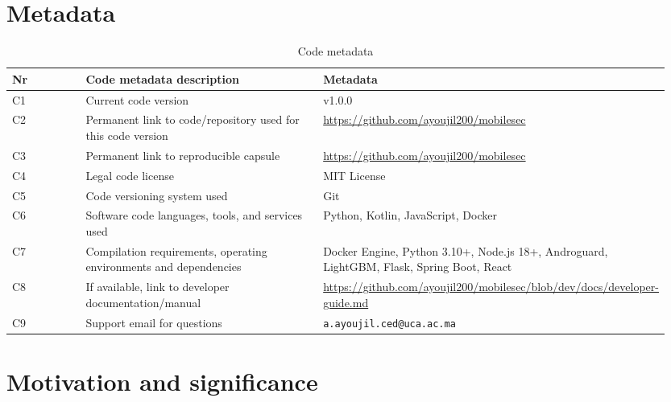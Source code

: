 \documentclass[preprint,12pt, a4paper]{elsarticle}
\begin{document}

\section*{Metadata}
\begin{table}[H]
\caption{Code metadata}
\label{codeMetadata}
\centering
\footnotesize
\renewcommand{\arraystretch}{1.15}
\begin{tabular}{p{0.12\linewidth} p{0.38\linewidth} p{0.45\linewidth}}
\hline
\textbf{Nr} & \textbf{Code metadata description} & \textbf{Metadata} \\
\hline

C1 & Current code version 
& v1.0.0 \\

C2 & Permanent link to code/repository used for this code version 
& \url{https://github.com/ayoujil200/mobilesec} \\

C3 & Permanent link to reproducible capsule 
& \url{https://github.com/ayoujil200/mobilesec} \\

C4 & Legal code license 
& MIT License \\

C5 & Code versioning system used 
& Git \\

C6 & Software code languages, tools, and services used 
& Python, Kotlin, JavaScript, Docker \\

C7 & Compilation requirements, operating environments and dependencies 
& Docker Engine, Python 3.10+, Node.js 18+, Androguard, LightGBM, Flask, Spring Boot, React \\

C8 & If available, link to developer documentation/manual 
& \textcolor{blue}{\url{https://github.com/ayoujil200/mobilesec/blob/dev/docs/developer-guide.md}} \\

C9 & Support email for questions 
& \texttt{a.ayoujil.ced@uca.ac.ma} \\

\hline
\end{tabular}
\end{table}

\section{Motivation and significance}
\end{document}
